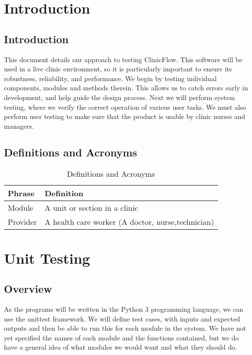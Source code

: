 \documentclass[12pt]{article}
\begin{document}
\section{Introduction}

\subsection{Introduction}
This document details our approach to testing ClinicFlow. This software will be used in a live clinic environment, so it is particularly important to ensure its robustness, reliability, and performance. We begin by testing individual components, modules and methods therein. This allows us to catch errors early in development, and help guide the design process. Next we will perform system testing, where we verify the correct operation of various user tasks. We must also perform user testing to make sure that the product is usable by clinic nurses and managers.

\subsection{Definitions and Acronyms} 
\begin{center}
\begin{longtable}{>{\raggedright\arraybackslash}p{}>{\raggedright\arraybackslash}p{}}
\caption{Definitions and Acronyms}\label{Table_Acronyms}\\
\toprule

\bf Phrase & \bf Definition\\\midrule
Module & A unit or section in a clinic \\\midrule
Provider & A health care worker (A doctor, nurse,technician) \\\midrule
\bottomrule
\end{longtable}
\end{center}

\section{Unit Testing}
\subsection{Overview}
	As the programs will be written in the Python 3 programming language, we can use the unittest framework. We will define test cases, with inputs and expected outputs and then be able to run this for each module in the system. We have not yet specified the names of each module and the functions contained, but we do have a general idea of what modules we would want and what they should do. 
\end{document}
